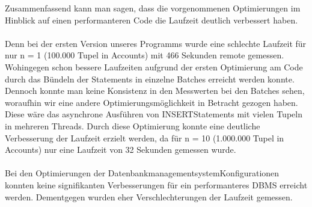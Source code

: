Zusammenfassend kann man sagen, dass die vorgenommenen Optimierungen im Hinblick auf einen performanteren Code die Laufzeit deutlich verbessert haben.\\
\\
Denn bei der ersten Version unseres Programms wurde eine schlechte Laufzeit für nur n = 1 (100.000 Tupel in Accounts) mit 466 Sekunden remote gemessen.
Wohingegen schon bessere Laufzeiten aufgrund der ersten Optimierung am Code durch das Bündeln der Statements in einzelne Batches erreicht werden konnte.
Dennoch konnte man keine Konsistenz in den Messwerten bei den Batches sehen, woraufhin wir eine andere Optimierungsmöglichkeit in Betracht gezogen haben.
Diese wäre das asynchrone Ausführen von INSERT\-Statements mit vielen Tupeln in mehreren Threads.
Durch diese Optimierung konnte eine deutliche Verbesserung der Laufzeit erzielt werden, da für n = 10 (1.000.000 Tupel in Accounts) nur eine Laufzeit von 32 Sekunden gemessen wurde.\\
\\
Bei den Optimierungen der Datenbankmanagementsystem\-Konfigurationen konnten keine signifikanten Verbesserungen für ein performanteres DBMS erreicht werden.
Dementgegen wurden eher Verschlechterungen der Laufzeit gemessen.